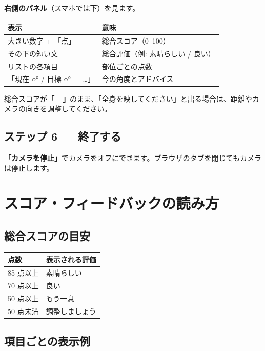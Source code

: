 \documentclass[a4paper,11pt]{ltjsarticle}
\begin{document}
\textbf{右側のパネル}（スマホでは下）を見ます。

\begin{table}[h]
  \centering
  \begin{tabular}{@{}ll@{}}
    \toprule
    表示 & 意味 \\
    \midrule
    大きい数字 + 「点」 & 総合スコア（0--100） \\
    その下の短い文 & 総合評価（例: 素晴らしい / 良い） \\
    リストの各項目 & 部位ごとの点数 \\
    「現在 ○° / 目標 ○° --- …」 & 今の角度とアドバイス \\
    \bottomrule
  \end{tabular}
\end{table}

総合スコアが\textbf{「---」}のまま、「全身を映してください」と出る場合は、距離やカメラの向きを調整してください。

\subsection{ステップ 6 --- 終了する}

\textbf{「カメラを停止」}でカメラをオフにできます。ブラウザのタブを閉じてもカメラは停止します。

\section{スコア・フィードバックの読み方}

\subsection{総合スコアの目安}

\begin{table}[h]
  \centering
  \begin{tabular}{@{}ll@{}}
    \toprule
    点数 & 表示される評価 \\
    \midrule
    85 点以上 & 素晴らしい \\
    70 点以上 & 良い \\
    50 点以上 & もう一息 \\
    50 点未満 & 調整しましょう \\
    \bottomrule
  \end{tabular}
\end{table}

\subsection{項目ごとの表示例}
\end{document}
